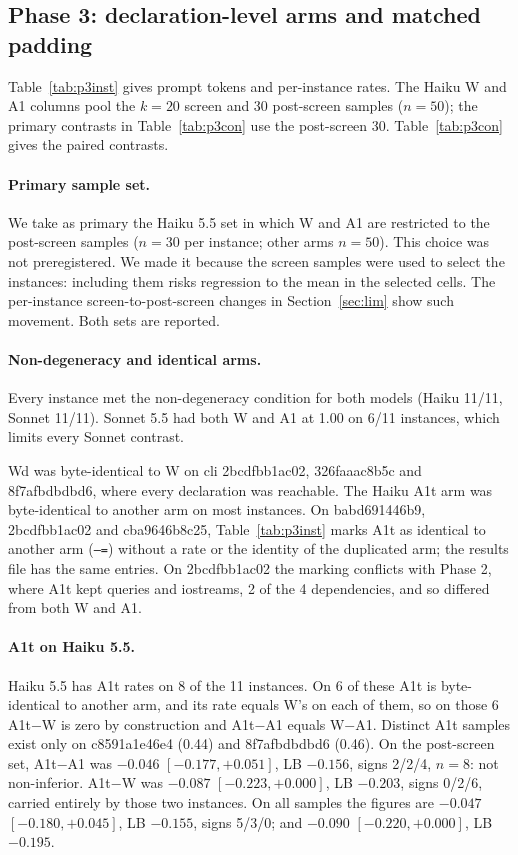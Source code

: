 \documentclass[10pt]{article}
\begin{document}
\subsection{Phase 3: declaration-level arms and matched padding}

Table~\ref{tab:p3inst} gives prompt tokens and per-instance rates. The Haiku W and A1 columns pool the $k=20$ screen and 30 post-screen samples ($n=50$); the primary contrasts in Table~\ref{tab:p3con} use the post-screen 30. Table~\ref{tab:p3con} gives the paired contrasts.

\paragraph{Primary sample set.} We take as primary the Haiku 5.5 set in which W and A1 are restricted to the post-screen samples ($n=30$ per instance; other arms $n=50$). This choice was not preregistered. We made it because the screen samples were used to select the instances: including them risks regression to the mean in the selected cells. The per-instance screen-to-post-screen changes in Section~\ref{sec:lim} show such movement. Both sets are reported.

\paragraph{Non-degeneracy and identical arms.} Every instance met the non-degeneracy condition for both models (Haiku 11/11, Sonnet 11/11). Sonnet 5.5 had both W and A1 at 1.00 on 6/11 instances, which limits every Sonnet contrast.

Wd was byte-identical to W on cli 2bcdfbb1ac02, 326faaac8b5c and 8f7afbdbdbd6, where every declaration was reachable. The Haiku A1t arm was byte-identical to another arm on most instances. On babd691446b9, 2bcdfbb1ac02 and cba9646b8c25, Table~\ref{tab:p3inst} marks A1t as identical to another arm (\texttt{--=}) without a rate or the identity of the duplicated arm; the results file has the same entries. On 2bcdfbb1ac02 the marking conflicts with Phase 2, where A1t kept queries and iostreams, 2 of the 4 dependencies, and so differed from both W and A1.

\paragraph{A1t on Haiku 5.5.} Haiku 5.5 has A1t rates on 8 of the 11 instances. On 6 of these A1t is byte-identical to another arm, and its rate equals W's on each of them, so on those 6 A1t$-$W is zero by construction and A1t$-$A1 equals W$-$A1. Distinct A1t samples exist only on c8591a1e46e4 (0.44) and 8f7afbdbdbd6 (0.46). On the post-screen set, A1t$-$A1 was $-0.046$ $[-0.177, +0.051]$, LB $-0.156$, signs 2/2/4, $n=8$: not non-inferior. A1t$-$W was $-0.087$ $[-0.223, +0.000]$, LB $-0.203$, signs 0/2/6, carried entirely by those two instances. On all samples the figures are $-0.047$ $[-0.180, +0.045]$, LB $-0.155$, signs 5/3/0; and $-0.090$ $[-0.220, +0.000]$, LB $-0.195$.
\end{document}
